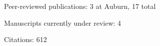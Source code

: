 \begin{veryTightItemize}
    \item Peer-reviewed publications: 3 at Auburn, 17 total
    \item Manuscripts currently under review: 4
    \item Citations: 612
\end{veryTightItemize}
